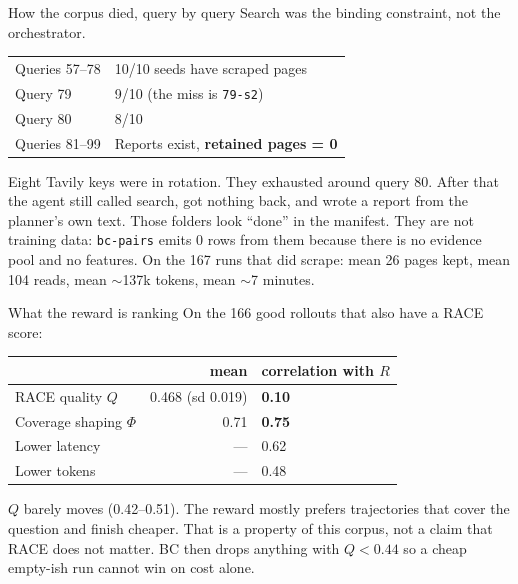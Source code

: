 \documentclass[aspectratio=169,11pt]{beamer}
\begin{document}
\begin{frame}{How the corpus died, query by query}
  Search was the binding constraint, not the orchestrator.
  \vspace{0.3em}
  \begin{tabular}{ll}
    \hline
    Queries 57--78 & 10/10 seeds have scraped pages \\
    Query 79 & 9/10 (the miss is \texttt{79-s2}) \\
    Query 80 & 8/10 \\
    Queries 81--99 & Reports exist, \textbf{retained pages = 0} \\
    \hline
  \end{tabular}
  \vspace{0.45em}
  Eight Tavily keys were in rotation. They exhausted around query 80.
  After that the agent still called search, got nothing back, and wrote a report from the planner's own text.
  Those folders look ``done'' in the manifest. They are not training data: \texttt{bc-pairs} emits 0 rows from them because there is no evidence pool and no features.
  \vspace{0.35em}
  On the 167 runs that did scrape: mean 26 pages kept, mean 104 reads, mean $\sim$137k tokens, mean $\sim$7 minutes.
\end{frame}

\begin{frame}{What the reward is ranking}
  On the 166 good rollouts that also have a RACE score:
  \vspace{0.3em}
  \begin{tabular}{lrl}
    \hline
    & mean & correlation with $R$ \\
    \hline
    RACE quality $Q$ & 0.468 (sd 0.019) & \textbf{0.10} \\
    Coverage shaping $\Phi$ & 0.71 & \textbf{0.75} \\
    Lower latency & --- & 0.62 \\
    Lower tokens & --- & 0.48 \\
    \hline
  \end{tabular}
  \vspace{0.5em}
  $Q$ barely moves (0.42--0.51). The reward mostly prefers trajectories that
  cover the question and finish cheaper. That is a property of this corpus,
  not a claim that RACE does not matter.
  \vspace{0.3em}
  {\small BC then drops anything with $Q < 0.44$ so a cheap empty-ish run cannot win on cost alone.}
\end{frame}
\end{document}
